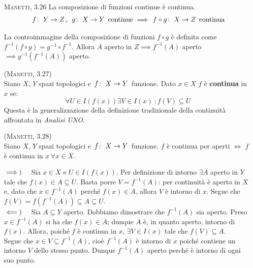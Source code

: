 \begin{theorema}\textsc{Manetti, 3.26}
La composizione di funzioni continue è continua.
\begin{equation}
\funz{f}{Y}{Z},\ \funz{g}{X}{Y}\text{ continue}\implies \funz{f\circ g}{X}{Z}\text{ continua}
\end{equation}
\end{theorema}
\begin{demonstration}
La controimmagine della composizione di funzioni $f\circ g$ è definita come $f^{-1}\left(f\circ g\right)=g^{-1}\circ f^{-1}$. Allora $A$ aperto in $Z\implies f^{-1}\left(A\right)$ aperto $\implies g^{-1}\left(f^{-1}\left(A\right)\right)$ aperto.%
\end{demonstration}
\begin{define}\textsc{(Manetti, 3.27)}\\
Siano $X$, $Y$ spazi topologici e $\funz{f}{X}{Y}$ funzione. Dato $x\in X$ $f$ è \textbf{continua} in $x$ se:
\begin{equation}
	\forall U\in I\left(f\left(x\right)\right)\exists V\in I\left(x\right)\ \colon f\left(V\right)\subseteq U
\end{equation}
Questa è la generalizzazione della definizione tradizionale della continuità affrontata in \textit{Analisi UNO}.
\end{define}
\begin{theorema}\textsc{(Manetti, 3.28)}\\
Siano $X$, $Y$ spazi topologici e $\funz{f}{X}{Y}$ funzione. $f$ è continua per aperti $\iff$ $f$ è continua in $x\ \forall x\in X$.
\end{theorema}
\begin{demonstration}
$\implies)\quad$ Sia $x\in X$ e $U\in I\left(f\left(x\right)\right)$. Per definizione di intorno $\exists A$ aperto in $Y$ tale che $f\left(x\right)\in A\subseteq U$.
Basta porre $V=f^{-1}\left(A\right)$: per continuità è aperto in $X$ e, dato che $x\in f^{-1}\left(A\right)$ perché $f\left(x\right)\in A$, allora $V$ è intorno di $x$. Segue che $f\left(V\right)=f\left(f^{-1}\left(A\right)\right)\subseteq A\subseteq U$.\\
$\impliedby)\quad$ Sia $A\subseteq Y$ aperto. Dobbiamo dimostrare che $f^{-1}\left(A\right)$ sia aperto. Preso $x\in f^{-1}\left(A\right)$ si ha che $f\left(x\right)\in A$; dunque $A$ è, in quanto aperto, intorno di $f\left(x\right)$. Allora, poiché $f$ è continua in $x$, $\exists V\in I\left(x\right)$ tale che $f\left(V\right)\subseteq A$.\\
Segue che $x\in V\subseteq f^{-1}\left(A\right)$, cioè $f^{-1}\left(A\right)$ è intorno di $x$ poiché contiene un intorno $V$ dello stesso punto. Dunque $f^{-1}\left(A\right)$ aperto perché è intorno di ogni suo punto.
\end{demonstration}
